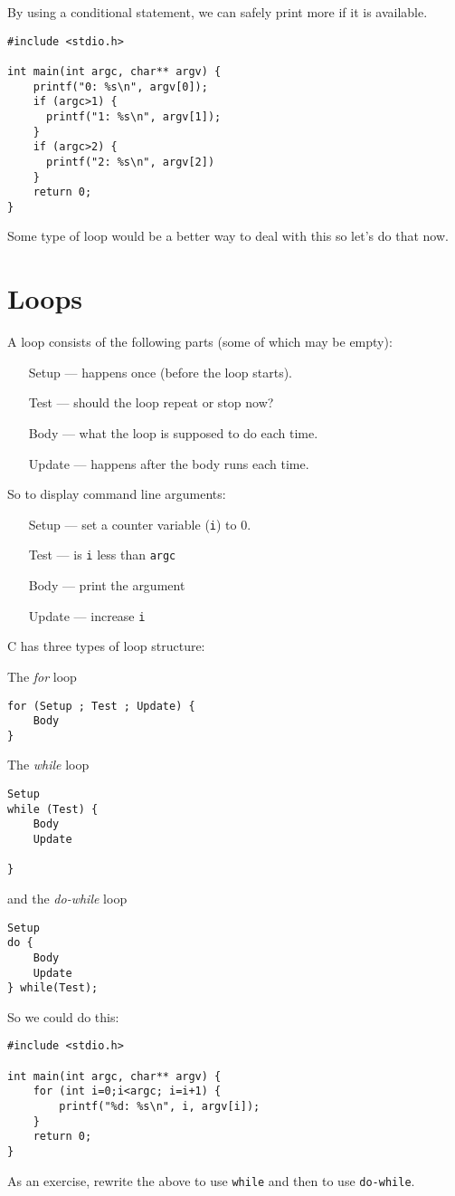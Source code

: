 By using a conditional statement, we can safely print more if it is available.
\begin{lstlisting}
#include <stdio.h>

int main(int argc, char** argv) {
    printf("0: %s\n", argv[0]);
    if (argc>1) {
      printf("1: %s\n", argv[1]);    
    }
    if (argc>2) {
      printf("2: %s\n", argv[2])
    }
    return 0;
}
\end{lstlisting}
Some type of loop would be a better way to deal with this so let's do that now.

\section{Loops}
A loop consists of the following parts (some of which may be empty):
\begin{itemize}
 \item [Setup] --- happens once (before the loop starts).
 \item [Test]  --- should the loop repeat or stop now?
 \item [Body]  --- what the loop is supposed to do each time.
 \item [Update] --- happens after the body runs each time.
\end{itemize}

So to display command line arguments:
\begin{itemize}
 \item [Setup] --- set a counter variable (\texttt{i}) to 0.
 \item [Test]  --- is \texttt{i} less than \texttt{argc}
 \item [Body]  --- print the argument
 \item [Update] --- increase \texttt{i}
\end{itemize}

C has three types of loop structure:

The \emph{for} loop
\begin{lstlisting}
for (Setup ; Test ; Update) {
    Body
}
\end{lstlisting}

The \emph{while} loop
\begin{lstlisting}
Setup
while (Test) {
    Body
    Update

}
\end{lstlisting}

and the \emph{do-while} loop
\begin{lstlisting}
Setup
do {
    Body
    Update
} while(Test);
\end{lstlisting}

So we could do this:
\begin{lstlisting}
#include <stdio.h>

int main(int argc, char** argv) {
    for (int i=0;i<argc; i=i+1) {
        printf("%d: %s\n", i, argv[i]);
    }
    return 0;
}
\end{lstlisting}

As an exercise, rewrite the above to use \texttt{while} and then to use \texttt{do-while}.